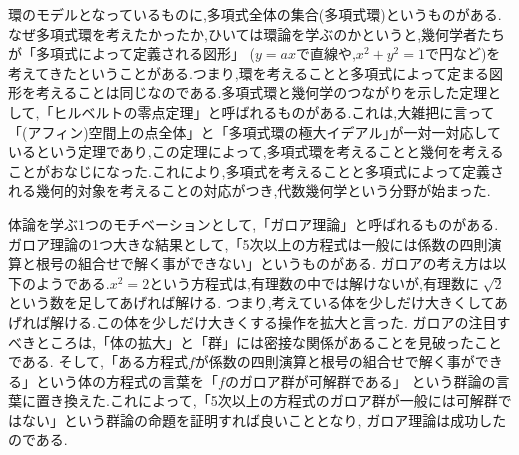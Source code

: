 環のモデルとなっているものに,多項式全体の集合(多項式環)というものがある.なぜ多項式環を考えたかったか,ひいては環論を学ぶのかというと,幾何学者たちが「多項式によって定義される図形」
($y=ax$で直線や,$x^2+y^2=1$で円など)を考えてきたということがある.つまり,環を考えることと多項式によって定まる図形を考えることは同じなのである.多項式環と幾何学のつながりを示した定理として,「ヒルベルトの零点定理」と呼ばれるものがある.これは,大雑把に言って「(アフィン)空間上の点全体」と「多項式環の極大イデアル｣が一対一対応しているという定理であり,この定理によって,多項式環を考えることと幾何を考えることがおなじになった.これにより,多項式を考えることと多項式によって定義される幾何的対象を考えることの対応がつき,代数幾何学という分野が始まった.


体論を学ぶ1つのモチベーションとして,「ガロア理論」と呼ばれるものがある.
ガロア理論の1つ大きな結果として,「5次以上の方程式は一般には係数の四則演算と根号の組合せで解く事ができない」というものがある.
ガロアの考え方は以下のようである.$x^2 = 2$という方程式は,有理数の中では解けないが,有理数に$\sqrt[]{2}$という数を足してあげれば解ける.
つまり,考えている体を少しだけ大きくしてあげれば解ける.この体を少しだけ大きくする操作を拡大と言った.
ガロアの注目すべきところは,「体の拡大」と「群」には密接な関係があることを見破ったことである.
そして,「ある方程式$f$が係数の四則演算と根号の組合せで解く事ができる」という体の方程式の言葉を「$f$のガロア群が可解群である」
という群論の言葉に置き換えた.これによって,「5次以上の方程式のガロア群が一般には可解群ではない」という群論の命題を証明すれば良いこととなり,
ガロア理論は成功したのである.